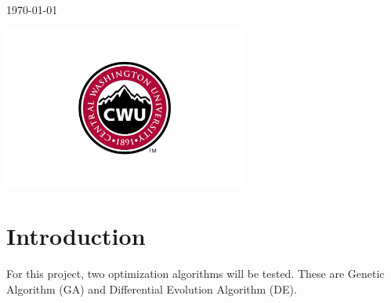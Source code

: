 \documentclass[12pt]{article}
\begin{document}
\begin{titlepage}
        
        \vfill
        
        {\large \today}\\ %
        
        \vfill
        
        \includegraphics[width=8cm]{CWU-Logo.png}\\[.5cm] %
        
        
        \vfill %
        
    \end{titlepage}
    \newpage
    \tableofcontents
    \newpage
    
    
    
    \section{Introduction}
    
    For this project, two optimization algorithms will be tested. These are Genetic Algorithm (GA) and Differential Evolution Algorithm (DE).
    
\end{document}
